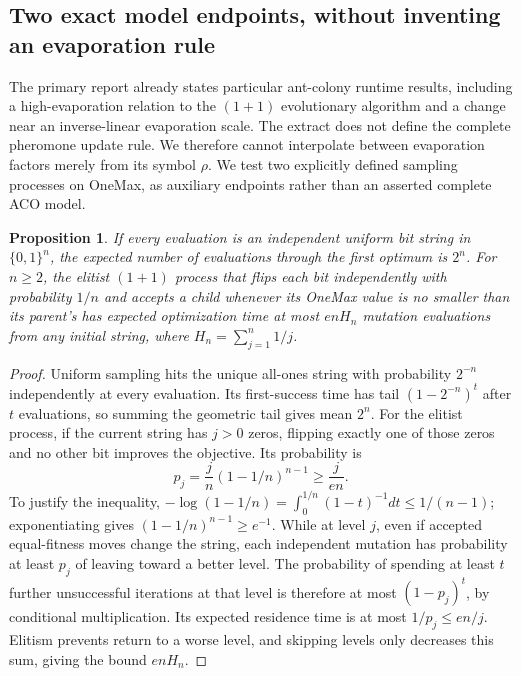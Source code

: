 \documentclass[11pt]{article}
\newtheorem{proposition}{Proposition}
\begin{document}
\subsection{Two exact model endpoints, without inventing an evaporation rule}
The primary report already states particular ant-colony runtime results, including a high-evaporation relation to the $(1+1)$ evolutionary algorithm and a change near an inverse-linear evaporation scale. The extract does not define the complete pheromone update rule. We therefore cannot interpolate between evaporation factors merely from its symbol $\rho$. We test two explicitly defined sampling processes on OneMax, as auxiliary endpoints rather than an asserted complete ACO model.
\begin{proposition}
If every evaluation is an independent uniform bit string in $\{0,1\}^n$, the expected number of evaluations through the first optimum is $2^n$. For $n\ge2$, the elitist $(1+1)$ process that flips each bit independently with probability $1/n$ and accepts a child whenever its OneMax value is no smaller than its parent's has expected optimization time at most $enH_n$ mutation evaluations from any initial string, where $H_n=\sum_{j=1}^n1/j$.
\end{proposition}
\begin{proof}
Uniform sampling hits the unique all-ones string with probability $2^{-n}$ independently at every evaluation. Its first-success time has tail $(1-2^{-n})^t$ after $t$ evaluations, so summing the geometric tail gives mean $2^n$.
For the elitist process, if the current string has $j>0$ zeros, flipping exactly one of those zeros and no other bit improves the objective. Its probability is
\[
p_j=\frac jn(1-1/n)^{n-1}\ge\frac j{en}.
\]
To justify the inequality, $-\log(1-1/n)=\int_0^{1/n}(1-t)^{-1}dt\le1/(n-1)$; exponentiating gives $(1-1/n)^{n-1}\ge e^{-1}$. While at level $j$, even if accepted equal-fitness moves change the string, each independent mutation has probability at least $p_j$ of leaving toward a better level. The probability of spending at least $t$ further unsuccessful iterations at that level is therefore at most $(1-p_j)^t$, by conditional multiplication. Its expected residence time is at most $1/p_j\le en/j$. Elitism prevents return to a worse level, and skipping levels only decreases this sum, giving the bound $enH_n$.
\end{proof}
\end{document}
